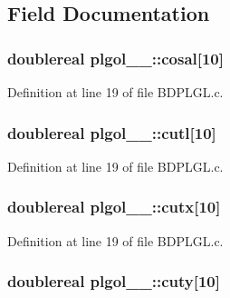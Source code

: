 \subsection{Field Documentation}
\subsubsection[{\texorpdfstring{cosal}{cosal}}]{\setlength{\rightskip}{0pt plus 5cm}doublereal plgol\+\_\+\_\+\+::cosal\mbox{[}10\mbox{]}}\hypertarget{structplgol__1___aef4f0977532490bdf1d5d453e70f314e}{}\label{structplgol__1___aef4f0977532490bdf1d5d453e70f314e}


Definition at line 19 of file B\+D\+P\+L\+G\+L.\+c.

\subsubsection[{\texorpdfstring{cutl}{cutl}}]{\setlength{\rightskip}{0pt plus 5cm}doublereal plgol\+\_\+\_\+\+::cutl\mbox{[}10\mbox{]}}\hypertarget{structplgol__1___af1bbaba2ab946442dc54cd18a6e91625}{}\label{structplgol__1___af1bbaba2ab946442dc54cd18a6e91625}


Definition at line 19 of file B\+D\+P\+L\+G\+L.\+c.

\subsubsection[{\texorpdfstring{cutx}{cutx}}]{\setlength{\rightskip}{0pt plus 5cm}doublereal plgol\+\_\+\_\+\+::cutx\mbox{[}10\mbox{]}}\hypertarget{structplgol__1___ade8c1ebd6cfd4ae295b3adbc923a534f}{}\label{structplgol__1___ade8c1ebd6cfd4ae295b3adbc923a534f}


Definition at line 19 of file B\+D\+P\+L\+G\+L.\+c.

\subsubsection[{\texorpdfstring{cuty}{cuty}}]{\setlength{\rightskip}{0pt plus 5cm}doublereal plgol\+\_\+\_\+\+::cuty\mbox{[}10\mbox{]}}\hypertarget{structplgol__1___af9ce5ba90d0c8fe468443d3ed93257fe}{}\label{structplgol__1___af9ce5ba90d0c8fe468443d3ed93257fe}


